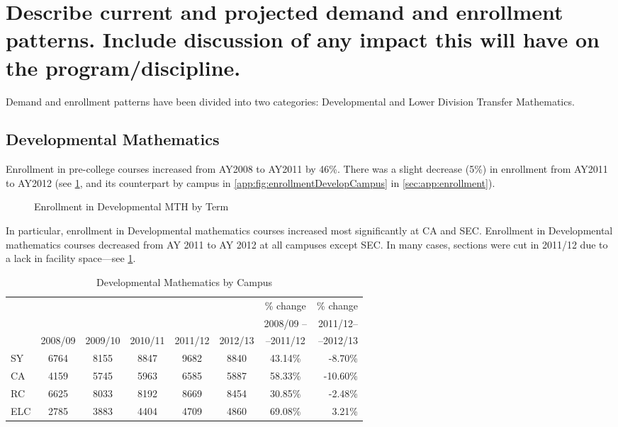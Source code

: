 \section{Describe current and projected demand and enrollment patterns.  Include discussion of any impact this will have on the program/discipline.
}
Demand and enrollment patterns have been divided into two categories: Developmental and Lower Division Transfer Mathematics.

\subsection{Developmental Mathematics}
Enrollment in pre-college courses increased from AY2008 to AY2011 by 46\%. There was a slight decrease (5\%) in enrollment from AY2011 to AY2012 (see \cref{needs:fig:enrollmentDevelopTerm}, and its counterpart by campus in \vref{app:fig:enrollmentDevelopCampus} in \cref{sec:app:enrollment}).

\begin{figure}[!htb]
	\centering
	
	\caption{Enrollment in Developmental MTH by Term}
	\label{needs:fig:enrollmentDevelopTerm}
\end{figure}

In particular, enrollment in Developmental mathematics courses increased most significantly at CA and SEC. Enrollment in Developmental mathematics courses decreased from AY 2011 to AY 2012 at all campuses except SEC. In many cases, sections were cut in 2011/12 due to a lack in facility space---see \cref{needs:tab:enrollmentDevelp}. 


\begin{table}[!htb]
	\caption{Developmental Mathematics by Campus}
	\label{needs:tab:enrollmentDevelp}
	\begin{tabular}{l*{6}{c}r}
		\toprule
		    &        &        &        &        &        & \% change & \% change \\
		    &		&	&	&	&	&2008/09 --	&2011/12--\\
		    & 2008/09 & 2009/10 & 2010/11 & 2011/12 & 2012/13 & --2011/12 &--2012/13 \\
		\midrule
		SY  & 6764   & 8155   & 8847   & 9682   & 8840   & 43.14\%   & -8.70\%   \\
		CA  & 4159   & 5745   & 5963   & 6585   & 5887   & 58.33\%   & -10.60\%  \\
		RC  & 6625   & 8033   & 8192   & 8669   & 8454   & 30.85\%   & -2.48\%   \\
		ELC & 2785   & 3883   & 4404   & 4709   & 4860   & 69.08\%   & 3.21\%    \\
		\bottomrule
	\end{tabular}
\end{table}

